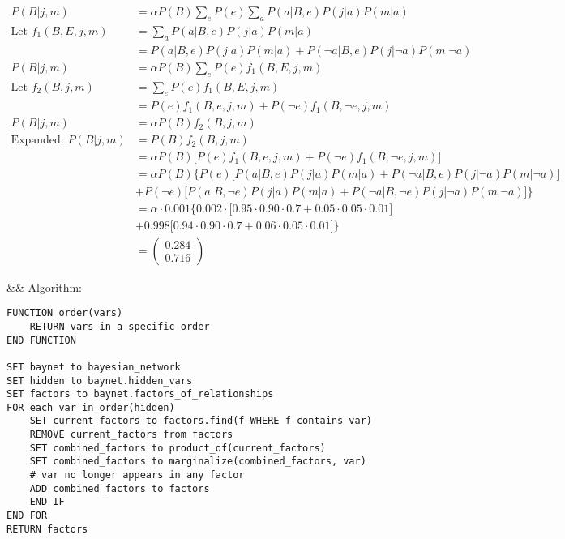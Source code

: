 	\begin{align*}
		P(B | j, m)
		&= \alpha P(B) \sum_e P(e) \sum_a P(a | B, e) P(j|a) P(m|a) \\[.5cm]
		\textrm{Let } f_1(B, E, j, m)
		&= \sum_a P(a | B, e) P(j|a) P(m|a) \\
		&= P(a | B, e) P(j|a) P(m|a) + P(\lnot a | B, e) P(j|\lnot a) P(m|\lnot a) \\[.5cm]
		P(B | j, m)
		&= \alpha P(B) \sum_e P(e) f_1(B, E, j, m) \\[.5cm]
		\textrm{Let } f_2(B, j, m)
		&= \sum_e P(e) f_1(B, E, j, m) \\
		&= P(e) f_1(B, e, j, m) + P(\lnot e) f_1(B, \lnot e, j, m) \\[.5cm]
		P(B | j, m)
		&= \alpha P(B) f_2(B, j, m) \\[1cm]
		\textrm{Expanded: } P(B | j, m)
		&= P(B) f_2 (B, j, m) \\
		&= \alpha P(B) \Big[ P(e) f_1(B, e, j, m) + P(\lnot e) f_1(B, \lnot e, j, m) \Big] \\
		&= \alpha P(B) \bigg\{
			P(e) \Big[
				P(a | B, e) P(j|a) P(m|a) +
				P(\lnot a | B, e) P(j|\lnot a) P(m|\lnot a)
			\Big] \\
		&+	P(\lnot e) \Big[
				P(a | B, \lnot e) P(j|a) P(m|a) +
				P(\lnot a | B, \lnot e) P(j|\lnot a) P(m|\lnot a)
			\Big]
		\bigg\} \\
		&= \alpha \cdot 0.001 \bigg\{
			0.002 \cdot \Big[
				0.95 \cdot 0.90 \cdot 0.7 +
				0.05 \cdot 0.05 \cdot 0.01
			\Big] \\
		&+	0.998 \Big[
				0.94 \cdot 0.90 \cdot 0.7 +
				0.06 \cdot 0.05 \cdot 0.01
			\Big]
		\bigg\} \\
		&= \begin{pmatrix} 0.284 \\ 0.716 \end{pmatrix}
	\end{align*}
	\begin{easylist}

	&& Algorithm:

\begin{Verbatim}
FUNCTION order(vars)
	RETURN vars in a specific order
END FUNCTION

SET baynet to bayesian_network
SET hidden to baynet.hidden_vars
SET factors to baynet.factors_of_relationships
FOR each var in order(hidden)
	SET current_factors to factors.find(f WHERE f contains var)
	REMOVE current_factors from factors
	SET combined_factors to product_of(current_factors)
	SET combined_factors to marginalize(combined_factors, var)
	# var no longer appears in any factor
	ADD combined_factors to factors
	END IF
END FOR
RETURN factors
\end{Verbatim}

\end{easylist}
